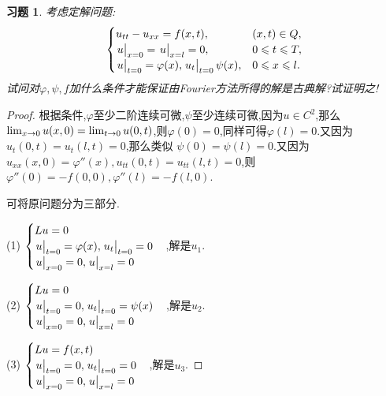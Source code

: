 \documentclass[a4paper,oneside,12pt]{ctexart}
\theoremstyle{plain}
\newtheorem{exercise}{习题}
\theoremstyle{nonumberplain}
\theoremstyle{nonumberplain}
\newtheorem{proof}{证明.}
\renewcommand{\phi}{\varphi}
\begin{document}
    \begin{exercise}
        \label{ex:27}
        考虑定解问题: 
        \begin{equation*}
            \begin{cases}
                u_{tt}-u_{xx}=f(x,t), & (x,t)\in Q,\\
                \eval{u}_{x=0}=\eval{u}_{x=l}=0, & 0\leqslant t\leqslant T,\\
                \eval{u}_{t=0}=\phi(x),\eval{u_t}_{t=0}\psi(x), & 0\leqslant x\leqslant l.
            \end{cases}
        \end{equation*}
        试问对$\phi,\psi,f$加什么条件才能保证由Fourier方法所得的解是古典解?试证明之!
    \end{exercise}

    \begin{proof}
        根据条件,$\phi$至少二阶连续可微,$\psi$至少连续可微,因为$u\in C^2$,那么$\lim_{x\to 0}u(x,0)\\=\lim_{t\to 0}u(0,t)$,则$\phi(0)=0$,同样可得$\phi(l)=0$.又因为$u_t(0,t)=u_t(l,t)=0$,那么类似
        $\psi(0)=\psi(l)=0$.又因为$u_{xx}(x,0)=\phi''(x),u_{tt}(0,t)=u_{tt}(l,t)=0$,则$\phi''(0)=-f(0,0),\phi''(l)=-f(l,0)$.

        可将原问题分为三部分.

        (1) $\begin{cases}
            Lu=0\\
            \eval{u}_{t=0}=\phi(x),\eval{u_t}_{t=0}=0\\
            \eval{u}_{x=0}=0,\eval{u}_{x=l}=0
        \end{cases}$,解是$u_1$.

        (2) $\begin{cases}
            Lu=0\\
            \eval{u}_{t=0}=0,\eval{u_t}_{t=0}=\psi(x)\\
            \eval{u}_{x=0}=0,\eval{u}_{x=l}=0
        \end{cases}$,解是$u_2$.

        (3) $\begin{cases}
            Lu=f(x,t)\\
            \eval{u}_{t=0}=0,\eval{u_t}_{t=0}=0\\
            \eval{u}_{x=0}=0,\eval{u}_{x=l}=0
        \end{cases}$,解是$u_3$.


\end{proof}
\end{document}
